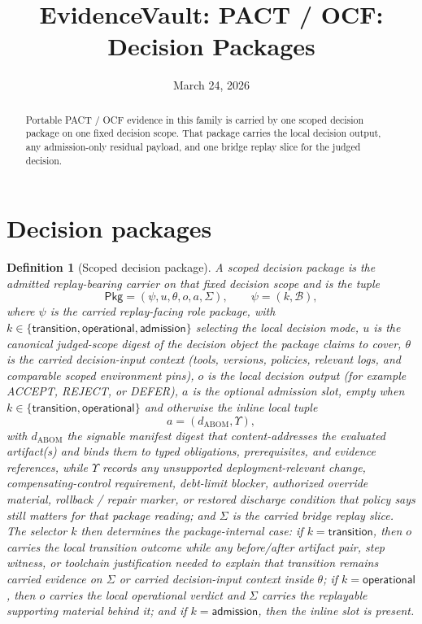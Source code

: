 \documentclass[11pt]{article}
\title{EvidenceVault: PACT / OCF: Decision Packages}
\author{}
\date{March 24, 2026}
\newtheorem{definition}{Definition}
\begin{document}
\maketitle

\begin{abstract}
Portable PACT / OCF evidence in this family is carried by one scoped decision package on one fixed decision scope.
That package carries the local decision output, any admission-only residual payload, and one bridge replay slice for the judged decision.
\end{abstract}

\section{Decision packages}


\begin{definition}[Scoped decision package]
A scoped decision package is the admitted replay-bearing carrier on that fixed decision scope and is the tuple
\[
\mathsf{Pkg}=(\psi,u,\theta,o,a,\Sigma),
\qquad
\psi=(k,\mathcal{B}),
\]
where $\psi$ is the carried replay-facing role package, with $k\in\{\mathsf{transition},\mathsf{operational},\mathsf{admission}\}$ selecting the local decision mode, $u$ is the canonical judged-scope digest of the decision object the package claims to cover, $\theta$ is the carried decision-input context (tools, versions, policies, relevant logs, and comparable scoped environment pins), $o$ is the local decision output (for example \textsf{ACCEPT}, \textsf{REJECT}, or \textsf{DEFER}), $a$ is the optional admission slot, empty when $k\in\{\mathsf{transition},\mathsf{operational}\}$ and otherwise the inline local tuple
\[
a=(d_{\mathrm{ABOM}},\Upsilon),
\]
with $d_{\mathrm{ABOM}}$ the signable manifest digest that content-addresses the evaluated artifact(s) and binds them to typed obligations, prerequisites, and evidence references, while $\Upsilon$ records any unsupported deployment-relevant change, compensating-control requirement, debt-limit blocker, authorized override material, rollback / repair marker, or restored discharge condition that policy says still matters for that package reading; and $\Sigma$ is the carried bridge replay slice.
The selector $k$ then determines the package-internal case: if $k=\mathsf{transition}$, then $o$ carries the local transition outcome while any before/after artifact pair, step witness, or toolchain justification needed to explain that transition remains carried evidence on $\Sigma$ or carried decision-input context inside $\theta$; if $k=\mathsf{operational}$, then $o$ carries the local operational verdict and $\Sigma$ carries the replayable supporting material behind it; and if $k=\mathsf{admission}$, then the inline slot is present.
\end{definition}
\end{document}
